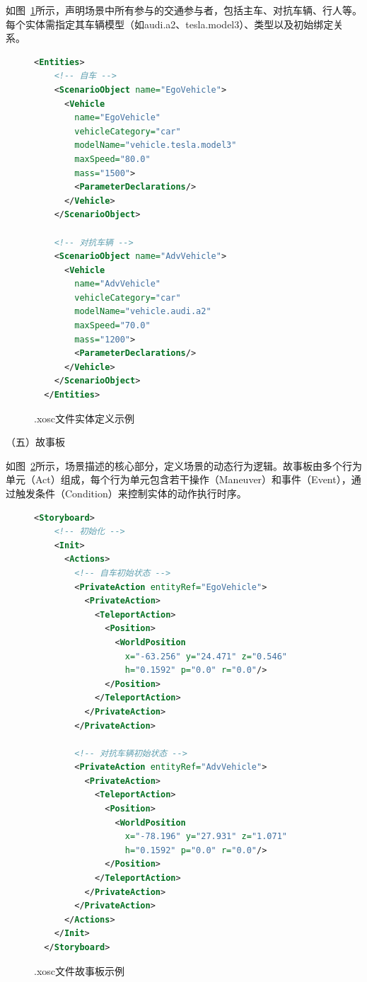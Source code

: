 如图~\ref{fig:xosc_entities}所示，声明场景中所有参与的交通参与者，包括主车、对抗车辆、行人等。每个实体需指定其车辆模型（如audi.a2、tesla.model3）、类型以及初始绑定关系。
\begin{figure}[H]
  \centering
  \begin{lstlisting}[language=XML]
  <Entities>
    <!-- 自车 -->
    <ScenarioObject name="EgoVehicle">
      <Vehicle
        name="EgoVehicle"
        vehicleCategory="car"
        modelName="vehicle.tesla.model3"
        maxSpeed="80.0"
        mass="1500">
        <ParameterDeclarations/>
      </Vehicle>
    </ScenarioObject>

    <!-- 对抗车辆 -->
    <ScenarioObject name="AdvVehicle">
      <Vehicle
        name="AdvVehicle"
        vehicleCategory="car"
        modelName="vehicle.audi.a2"
        maxSpeed="70.0"
        mass="1200">
        <ParameterDeclarations/>
      </Vehicle>
    </ScenarioObject>
  </Entities>
  \end{lstlisting}
  \caption{.xosc文件实体定义示例}
  \label{fig:xosc_entities}
\end{figure}	











（五）故事板

如图~\ref{fig:xosc_storyboard}所示，场景描述的核心部分，定义场景的动态行为逻辑。故事板由多个行为单元（Act）组成，每个行为单元包含若干操作（Maneuver）和事件（Event），通过触发条件（Condition）来控制实体的动作执行时序。

\begin{figure}[H]
  \centering
  \begin{lstlisting}[language=XML]
  <Storyboard>
    <!-- 初始化 -->
    <Init>
      <Actions>
        <!-- 自车初始状态 -->
        <PrivateAction entityRef="EgoVehicle">
          <PrivateAction>
            <TeleportAction>
              <Position>
                <WorldPosition
                  x="-63.256" y="24.471" z="0.546"
                  h="0.1592" p="0.0" r="0.0"/>
              </Position>
            </TeleportAction>
          </PrivateAction>
        </PrivateAction>

        <!-- 对抗车辆初始状态 -->
        <PrivateAction entityRef="AdvVehicle">
          <PrivateAction>
            <TeleportAction>
              <Position>
                <WorldPosition
                  x="-78.196" y="27.931" z="1.071"
                  h="0.1592" p="0.0" r="0.0"/>
              </Position>
            </TeleportAction>
          </PrivateAction>
        </PrivateAction>
      </Actions>
    </Init>
  </Storyboard>
  \end{lstlisting}
  \caption{.xosc文件故事板示例}
  \label{fig:xosc_storyboard}
\end{figure}	




















